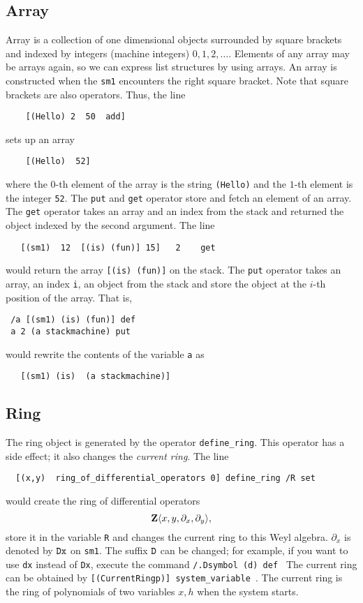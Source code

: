 \subsection{Array}
Array is a collection of one dimensional objects surrounded by square
brackets and
indexed by integers (machine integers) $0, 1, 2, \ldots$.
Elements of any array may be arrays again, so we can express
list structures by using arrays.
An array is constructed when the {\tt sm1} encounters the right square
bracket. 
Note that square brackets are also operators.
Thus, the line
\begin{verbatim}
    [(Hello) 2  50  add]
\end{verbatim}
sets up an array
\begin{verbatim}
    [(Hello)  52]
\end{verbatim}
where the $0$-th element of the array is the string
{\tt (Hello)}
and the $1$-th element is the integer {\tt 52}.
The {\tt put} and {\tt get} operator store and fetch an element of
an array.
The {\tt get} operator takes an array and an index from the stack
and returned the object indexed by the second argument.
The line
\begin{verbatim}
   [(sm1)  12  [(is) (fun)] 15]   2    get
\end{verbatim}
would return the array
{\tt [(is) (fun)]} on the stack.
The {\tt put} operator takes an array, an index {\tt i}, an object
from the stack
and store the object at the $i$-th position of the array.
That is,
\begin{verbatim}
 /a [(sm1) (is) (fun)] def
 a 2 (a stackmachine) put
\end{verbatim}
would rewrite the contents of the variable {\tt a} as
\begin{verbatim}
   [(sm1) (is)  (a stackmachine)]
\end{verbatim}

\subsection{Ring}

The ring object is generated by the operator {\tt define\_ring}.
This operator has a side effect;
it also changes the {\it current ring}.
The line
\begin{verbatim}
  [(x,y)  ring_of_differential_operators 0] define_ring /R set
\end{verbatim}
would create the ring of differential operators
$$ {\bf Z} \langle x, y, \partial_x, \partial_y \rangle, $$
store it in the variable {\tt R} and changes the current ring
to this Weyl algebra.
$\partial_x$ is denoted by ${\tt Dx}$ on {\tt sm1}.
The suffix ${\tt D}$ can be changed;
for example, if you want to use {\tt dx} instead of {\tt Dx},
execute the command
{\tt /\at \at \at}\verb+.Dsymbol (d) def +
The current ring can be obtained by
{\tt [(CurrentRingp)] system\_variable }.
The current ring is the ring of polynomials of
two variables $x, h$ when the system starts.

